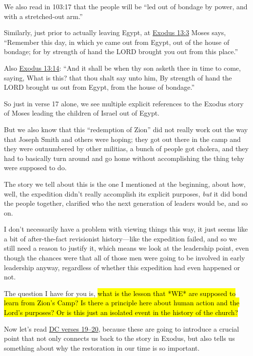 \begin{compactitem}
\begin{compactitem}
\begin{compactitem}
							\item We also read in 103:17 that the people will be ``led out of bondage by power, and with a stretched-out arm.''
							\item Similarly, just prior to actually leaving Egypt, at \hyperref[EXODUS-13-3]{Exodus 13:3} Moses says, ``Remember this day, in which ye came out from Egypt, out of the house of bondage; for by strength of hand the LORD brought you out from this place.''
							\item Also \hyperref[EXODUS-13-14]{Exodus 13:14}: ``And it shall be when thy son asketh thee in time to come, saying, What is this? that thou shalt say unto him, By strength of hand the LORD brought us out from Egypt, from the house of bondage.''
							\item So just in verse 17 alone, we see multiple explicit references to the Exodus story of Moses leading the children of Israel out of Egypt.
							\item But we also know that this ``redemption of Zion'' did not really work out the way that Joseph Smith and others were hoping; they got out there in the camp and they were outnumbered by other militias, a bunch of people got cholera, and they had to basically turn around and go home without accomplishing the thing tehy were supposed to do.
							\item The story we tell about this is the one I mentioned at the beginning, about how, well, the expedition didn't really accomplish its explicit purposes, \textit{but} it did bond the people together, clarified who the next generation of leaders would be, and so on.
							\item I don't necessarily have a problem with viewing things this way, it just seems like a bit of after-the-fact revisionist history---like the expedition failed, and so we still need a reason to justify it, which means we look at the leadership point, even though the chances were that all of those men were going to be involved in early leadership anyway, regardless of whether this expedition had even happened or not.
							\item The question I have for you is, \hl{what is the lesson that *WE* are supposed to learn from Zion's Camp? Is there a principle here about human action and the Lord's purposes? Or is this just an isolated event in the history of the church?}
						\end{compactitem}
					\item Now let's read \hyperref[DC103-19]{DC verses 19--20}, because these are going to introduce a crucial point that not only connects us back to the story in Exodus, but also tells us something about why the restoration in our time is so important.

\end{compactitem}
\end{compactitem}
